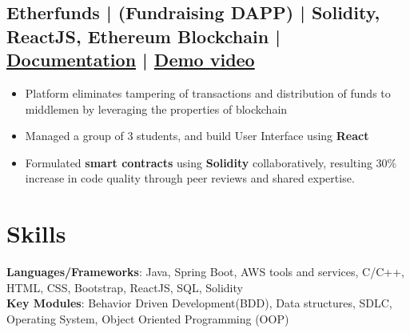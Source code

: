 \documentclass[a4,10pt]{article}
\newenvironment{zitemize}{
\begin{itemize}\itemsep0pt \parskip0pt \parsep1pt}
{\end{itemize}\vspace{-0.5cm}}
\begin{document}



\subsection*{Etherfunds {\normalsize\normalfont | (Fundraising DAPP) | Solidity, ReactJS, Ethereum Blockchain } |  {\href{https://developersleague.github.io/Etherfunds/}{Documentation} } | {\href{https://youtu.be/UXFDYHBjoxo}{Demo video} }
} 
    \begin{zitemize}
        \item Platform eliminates tampering of transactions and distribution of funds to middlemen by leveraging the properties of blockchain
        \item Managed a group of 3 students, and build User Interface using \textbf{React}
        \item Formulated \textbf{smart contracts} using \textbf{Solidity} collaboratively, resulting 30\% increase in code quality through peer reviews and shared expertise.
    \end{zitemize}



\section{Skills}
\textbf{Languages/Frameworks}: Java, Spring Boot, AWS tools and services, C/C++, HTML, CSS, Bootstrap, ReactJS, SQL, Solidity \\ 
\textbf{Key Modules}: Behavior Driven Development(BDD), Data structures, SDLC, Operating System, Object Oriented Programming (OOP)
\end{document}
